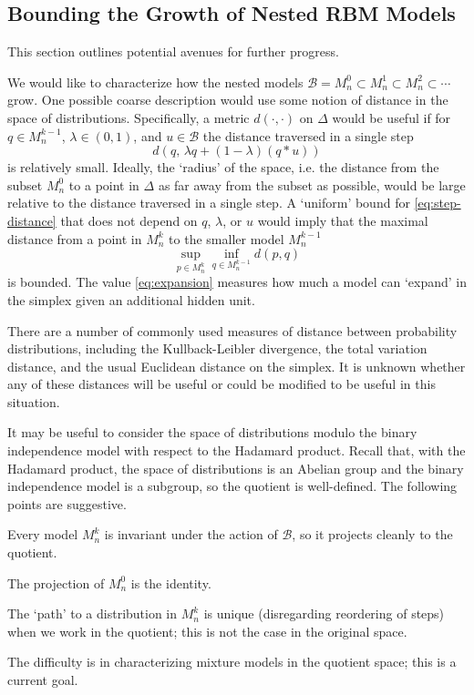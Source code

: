 \documentclass[11pt,titlepage]{article}
\newcommand*{\Bin}{\mathcal{B}}
\numberwithin{equation}{section}
\begin{document}
\subsection{Bounding the Growth of Nested RBM Models}

    This section outlines potential avenues for further progress.

    We would like to characterize how the nested models $\Bin = M_n^0 \subset
    M_n^1 \subset M_n^2 \subset \cdots$ grow.  One possible coarse description
    would use some notion of distance in the space of distributions.
    Specifically, a metric $d(\cdot, \cdot)$ on $\Delta$ would be useful
    if for $q \in M_n^{k-1}$, $\lambda \in (0,1)$, and $u \in \Bin$ the distance
    traversed in a single step
    \begin{equation}\label{eq:step-distance}
        d(q,\, \lambda q + (1 - \lambda)(q * u))
    \end{equation}
    is relatively small.  Ideally, the `radius' of the space, i.e. the distance
    from the subset $M_n^0$ to a point in $\Delta$ as far away from the subset
    as possible, would be large relative to the distance traversed in a single
    step.  A `uniform' bound for \eqref{eq:step-distance} that does not depend
    on $q$, $\lambda$, or $u$ would imply that the maximal distance from a point
    in $M_n^k$ to the smaller model $M_n^{k-1}$
    \begin{equation}\label{eq:expansion}
        \sup_{p \in M_n^k}
        \inf_{q \in M_n^{k-1}} d(p, q)
    \end{equation}
    is bounded.  The value \eqref{eq:expansion} measures how much a model can
    `expand' in the simplex given an additional hidden unit. 
    
    There are a number of commonly used
    measures of distance between probability distributions, including the
    Kullback-Leibler divergence, the total variation distance, and the usual
    Euclidean distance on the simplex.  It is unknown whether any of these
    distances will be useful or could be modified to be useful in this
    situation.

    It may be useful to consider the space of distributions modulo the binary
    independence model with respect to the Hadamard product.  Recall that, with
    the Hadamard product, the space of distributions is an Abelian group and the
    binary independence model is a subgroup, so the quotient is well-defined.
    The following points are suggestive.
    \begin{itemize*}
        \item Every model $M_n^k$ is invariant under the action of $\Bin$, so
        it projects cleanly to the quotient.
        \item The projection of $M_n^0$ is the identity.
        \item The `path' to a distribution in $M_n^k$ is unique (disregarding
        reordering of steps) when we work in the quotient; this is not the case
        in the original space.
    \end{itemize*}
    The difficulty is in characterizing mixture models in the quotient space; this
    is a current goal.
    
\end{document}
